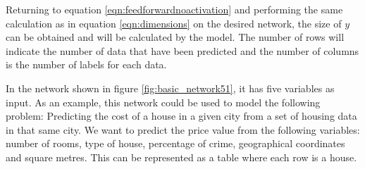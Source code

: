 Returning to equation \ref{eqn:feedforwardnoactivation} and performing the same calculation as in equation \ref{eqn:dimensions} on the desired network, the size of $y$ can be obtained and will be calculated by the model. The number of rows will indicate the number of data that have been predicted and the number of columns is the number of labels for each data.
\newline

In the network shown in figure \ref{fig:basic_network51}, it has five variables as input. As an example, this network could be used to model the following problem: Predicting the cost of a house in a given city from a set of housing data in that same city. We want to predict the price value from the following variables: number of rooms, type of house, percentage of crime, geographical coordinates and square metres. This can be represented as a table where each row is a house.
\newline


